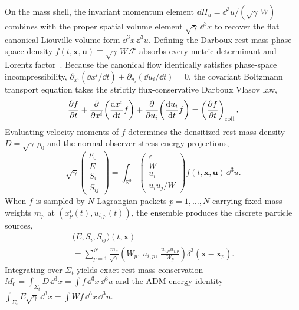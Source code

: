 On the mass shell, the invariant momentum element $\dd\Pi_u = \dd^3 u / (\sqrt{\gamma}\,W)$ combines with the proper spatial volume element $\sqrt{\gamma}\,\dd^3 x$ to recover the flat canonical Liouville volume form $\dd^3 x\,\dd^3 u$. Defining the Darboux rest-mass phase-space density $f(t, \bm{x}, \bm{u}) \equiv \sqrt{\gamma}\,W\,\mathcal{F}$ absorbs every metric determinant and Lorentz factor~\cite{Acuna-Cardenas:2021nkj}. Because the canonical flow identically satisfies phase-space incompressibility, $\partial_{x^i}(\dd x^i/\dd t) + \partial_{u_i}(\dd u_i/\dd t) = 0$, the covariant Boltzmann transport equation takes the strictly flux-conservative Darboux Vlasov law,
\begin{equation}\label{eq:darboux_vlasov}
\frac{\partial f}{\partial t} + \frac{\partial}{\partial x^i}\!\left(\frac{\mathrm{d} x^i}{\mathrm{d} t} f\right) + \frac{\partial}{\partial u_i}\!\left(\frac{\mathrm{d} u_i}{\mathrm{d} t} f\right) = \left(\frac{\partial f}{\partial t}\right)_{\rm coll}.
\end{equation}
Evaluating velocity moments of $f$ determines the densitized rest-mass density $D = \sqrt{\gamma}\,\rho_0$ and the normal-observer stress-energy projections,
\begin{equation}\label{eq:adm_sources}
\sqrt{\gamma}\begin{pmatrix} \rho_0 \\ E \\ S_i \\ S_{ij} \end{pmatrix}
= \int_{\mathbb{R}^3} \begin{pmatrix} \varepsilon \\ W \\ u_i \\ u_i u_j / W \end{pmatrix} f(t, \bm{x}, \bm{u})\,\dd^3 u.
\end{equation}
When $f$ is sampled by $N$ Lagrangian packets $p = 1,\dots,N$ carrying fixed mass weights $m_p$ at $(x_p^i(t), u_{i,p}(t))$, the ensemble produces the discrete particle sources,
\begin{multline}\label{eq:particle_sources}
\bigl(E, S_i, S_{ij}\bigr)(t,\bm{x}) \\
= \sum_{p=1}^{N} \frac{m_p}{\sqrt{\gamma}}\!\left(W_p,\, u_{i,p},\, \frac{u_{i,p} u_{j,p}}{W_p}\right)\delta^3(\bm{x} - \bm{x}_p).
\end{multline}
Integrating over $\Sigma_t$ yields exact rest-mass conservation $M_0 = \int_{\Sigma_t} D\,\dd^3 x = \int f\,\dd^3 x\,\dd^3 u$ and the ADM energy identity $\int_{\Sigma_t} E\sqrt{\gamma}\,\dd^3 x = \int W f\,\dd^3 x\,\dd^3 u$.

